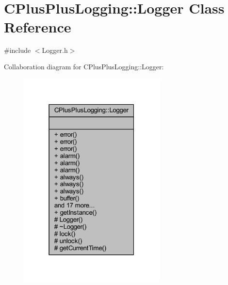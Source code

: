 \hypertarget{class_c_plus_plus_logging_1_1_logger}{}\section{C\+Plus\+Plus\+Logging\+:\+:Logger Class Reference}
\label{class_c_plus_plus_logging_1_1_logger}


{\ttfamily \#include $<$Logger.\+h$>$}



Collaboration diagram for C\+Plus\+Plus\+Logging\+:\+:Logger\+:
\nopagebreak
\begin{figure}[H]
\begin{center}
\leavevmode
\includegraphics[width=211pt]{class_c_plus_plus_logging_1_1_logger__coll__graph}
\end{center}
\end{figure}
